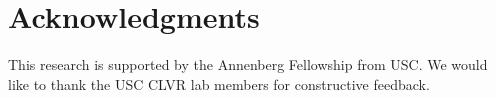 \documentclass[conference]{IEEEtran}
\begin{document}
\maketitle

\begin{abstract}

\end{abstract}

\IEEEpeerreviewmaketitle







\section*{Acknowledgments}
This research is supported by the Annenberg Fellowship from USC. We would like to thank the USC CLVR lab members for constructive feedback.





\clearpage

\end{document}
